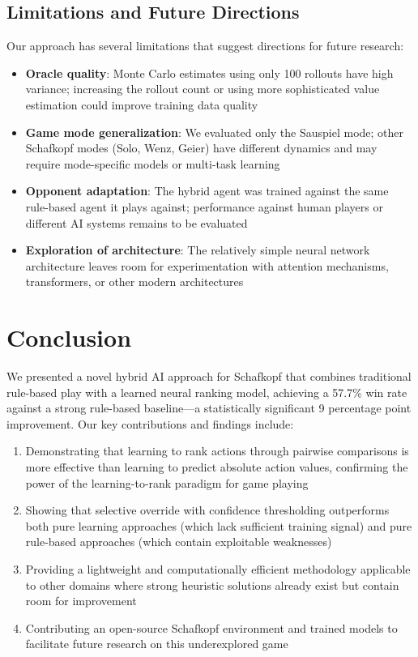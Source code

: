 \documentclass[conference]{IEEEtran}
\begin{document}
\subsection{Limitations and Future Directions}

Our approach has several limitations that suggest directions for future research:

\begin{itemize}
    \item \textbf{Oracle quality}: Monte Carlo estimates using only 100 rollouts have high variance; increasing the rollout count or using more sophisticated value estimation could improve training data quality
    \item \textbf{Game mode generalization}: We evaluated only the Sauspiel mode; other Schafkopf modes (Solo, Wenz, Geier) have different dynamics and may require mode-specific models or multi-task learning
    \item \textbf{Opponent adaptation}: The hybrid agent was trained against the same rule-based agent it plays against; performance against human players or different AI systems remains to be evaluated
    \item \textbf{Exploration of architecture}: The relatively simple neural network architecture leaves room for experimentation with attention mechanisms, transformers, or other modern architectures
\end{itemize}

\section{Conclusion}

We presented a novel hybrid AI approach for Schafkopf that combines traditional rule-based play with a learned neural ranking model, achieving a 57.7\% win rate against a strong rule-based baseline—a statistically significant 9 percentage point improvement. Our key contributions and findings include:

\begin{enumerate}
    \item Demonstrating that learning to rank actions through pairwise comparisons is more effective than learning to predict absolute action values, confirming the power of the learning-to-rank paradigm for game playing
    \item Showing that selective override with confidence thresholding outperforms both pure learning approaches (which lack sufficient training signal) and pure rule-based approaches (which contain exploitable weaknesses)
    \item Providing a lightweight and computationally efficient methodology applicable to other domains where strong heuristic solutions already exist but contain room for improvement
    \item Contributing an open-source Schafkopf environment and trained models to facilitate future research on this underexplored game
\end{enumerate}
\end{document}
